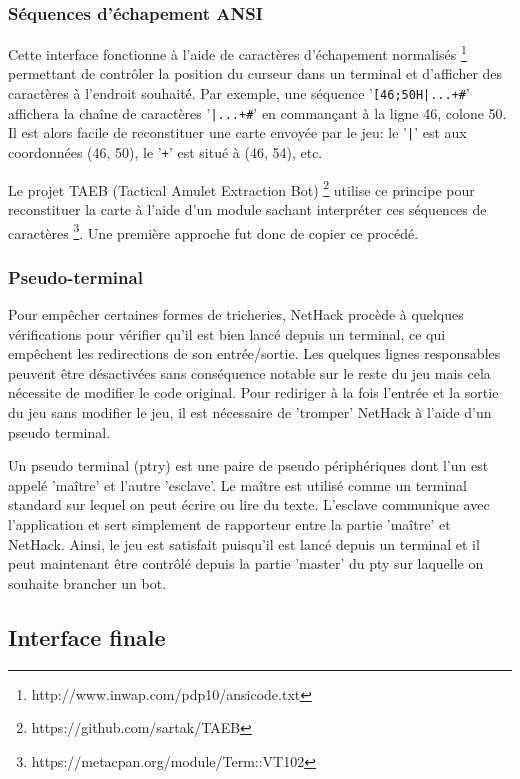 \documentclass[a4paper]{article}
\begin{document}
\subsubsection*{Séquences d'échapement ANSI}

Cette interface fonctionne à l'aide de caractères d'échapement normalisés \footnote{http://www.inwap.com/pdp10/ansicode.txt} permettant de contrôler la position du curseur dans un terminal et d'afficher des caractères à l'endroit souhaité. Par exemple, une séquence '\verb![46;50H|...+#!' affichera la chaîne de caractères '\verb!|...+#!' en commançant à la ligne 46, colone 50. Il est alors facile de reconstituer une carte envoyée par le jeu: le '\verb!|!' est aux coordonnées (46, 50), le '\verb!+!' est situé à (46, 54), etc.
	
	Le projet TAEB (Tactical Amulet Extraction Bot) \footnote{https://github.com/sartak/TAEB} utilise ce principe pour reconstituer la carte à l'aide d'un module sachant interpréter ces séquences de caractères \footnote{https://metacpan.org/module/Term::VT102}. Une première approche fut donc de copier ce procédé.

\subsubsection*{Pseudo-terminal}

Pour empêcher certaines formes de tricheries, NetHack procède à quelques vérifications pour vérifier qu'il est bien lancé depuis un terminal, ce qui empêchent les redirections de son entrée/sortie. Les quelques lignes responsables peuvent être désactivées sans conséquence notable sur le reste du jeu mais cela nécessite de modifier le code original. Pour rediriger à la fois l'entrée et la sortie du jeu sans modifier le jeu, il est nécessaire de 'tromper' NetHack à l'aide d'un pseudo terminal.

Un pseudo terminal (ptry) est une paire de pseudo périphériques dont l'un est appelé 'maître' et l'autre 'esclave'. Le maître est utilisé comme un terminal standard sur lequel on peut écrire ou lire du texte. L'esclave communique avec l'application et sert simplement de rapporteur entre la partie 'maître' et NetHack. Ainsi, le jeu est satisfait puisqu'il est lancé depuis un terminal et il peut maintenant être contrôlé depuis la partie 'master' du pty sur laquelle on souhaite brancher un bot.

\subsection{Interface finale}
\end{document}
